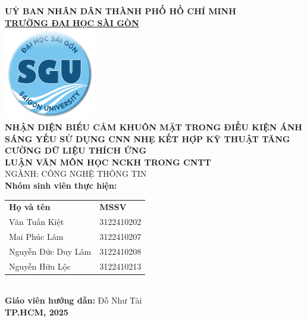 \begin{titlepage}

    \vspace*{-1cm} 
    \centering

    {\LARGE \textbf{UỶ BAN NHÂN DÂN THÀNH PHỐ HỒ CHÍ MINH}} \\[0.5cm] %
    {\Large \textbf{\underline{TRƯỜNG ĐẠI HỌC SÀI GÒN}}} \\[1cm]

    \includegraphics[width=4cm]{./img/logo.png} \\[1cm]

    {\huge \textbf{NHẬN DIỆN BIỂU CẢM KHUÔN MẶT TRONG ĐIỀU KIỆN ÁNH SÁNG YẾU SỬ DỤNG CNN NHẸ KẾT HỢP KỸ THUẬT TĂNG CƯỜNG DỮ LIỆU THÍCH ỨNG}} \\[1.5cm]

    {\Large \textbf{LUẬN VĂN MÔN HỌC NCKH TRONG CNTT}} \\[0.5cm]
    {\Large NGÀNH: CÔNG NGHỆ THÔNG TIN} \\[1cm]

    \textbf{Nhóm sinh viên thực hiện:} \\[0.5cm]
    \begin{tabular}{l l}
        \textbf{Họ và tên} & \textbf{MSSV} \\ 
        Văn Tuấn Kiệt & 3122410202 \\ 
        Mai Phúc Lâm & 3122410207 \\ 
        Nguyễn Đức Duy Lâm & 3122410208 \\ 
        Nguyễn Hữu Lộc & 3122410213 \\ 
    \end{tabular}
    \\[1cm]  %
    \textbf{Giáo viên hướng dẫn:} Đỗ Như Tài \\[0.5cm]
    \textbf{TP.HCM, 2025}
\end{titlepage}